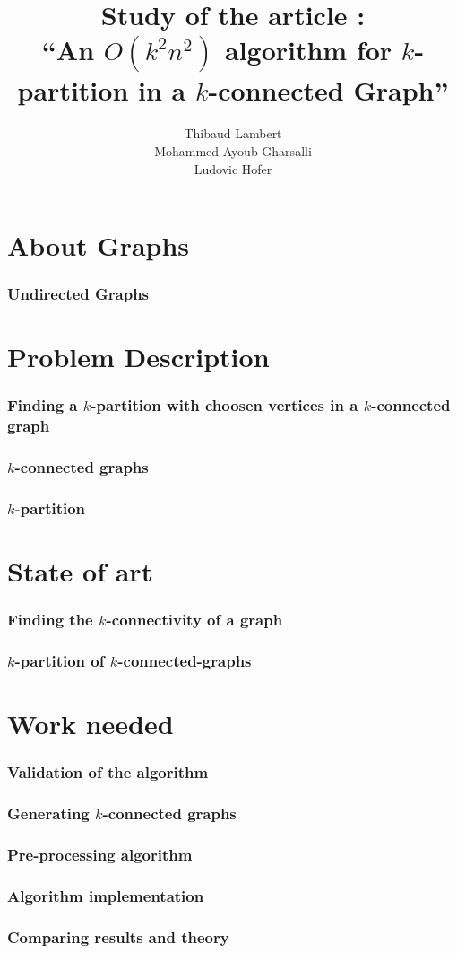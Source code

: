 \documentclass[xcolor=dvipsnames]{beamer}
\title[$O(k^2n^2)$ algorithm for $k$-partitionning]{Study of the article :\\``An $O(k^2n^2)$ algorithm for $k$-partition in a $k$-connected Graph''}
\author[Lambert, Gharsalli, Hofer]
       {Thibaud Lambert\\Mohammed Ayoub Gharsalli\\Ludovic Hofer}
\institute{University of Bordeaux}
\begin{document}
\begin{frame}[plain]
  \maketitle
\end{frame}

\begin{frame}[plain]
  \tableofcontents
\end{frame}

\section{About Graphs}

\begin{frame}
  \frametitle{Undirected Graphs}
\end{frame}


\section{Problem Description}

\begin{frame}
  \frametitle{Finding a $k$-partition with choosen vertices in a $k$-connected
    graph}
\end{frame}

\begin{frame}
  \frametitle{$k$-connected graphs}
\end{frame}

\begin{frame}
  \frametitle{$k$-partition}
\end{frame}

\section{State of art}

\begin{frame}
  \frametitle{Finding the $k$-connectivity of a graph}
\end{frame}

\begin{frame}
  \frametitle{$k$-partition of $k$-connected-graphs}
\end{frame}

\section{Work needed}

\begin{frame}
  \frametitle{Validation of the algorithm}
\end{frame}

\begin{frame}
  \frametitle{Generating $k$-connected graphs}
\end{frame}

\begin{frame}
  \frametitle{Pre-processing algorithm}
\end{frame}

\begin{frame}
  \frametitle{Algorithm implementation}
\end{frame}

\begin{frame}
  \frametitle{Comparing results and theory}
\end{frame}
\end{document}
